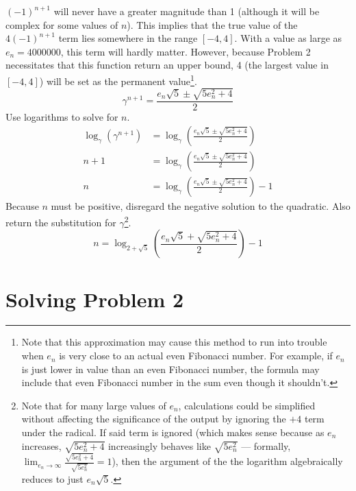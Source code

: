 \documentclass[titlepage]{article}
\begin{document}
$(-1)^{n+1}$ will never have a greater magnitude than 1 (although it will be complex for some values of $n$). This implies that the true value of the $4(-1)^{n+1}$ term lies somewhere in the range $[-4,4]$. With a value as large as $e_n=4000000$, this term will hardly matter. However, because Problem 2 necessitates that this function return an upper bound, 4 (the largest value in $[-4,4]$) will be set as the permanent value\footnote{Note that this approximation may cause this method to run into trouble when $e_n$ is very close to an actual even Fibonacci number. For example, if $e_n$ is just lower in value than an even Fibonacci number, the formula may include that even Fibonacci number in the sum even though it shouldn't.}.
\begin{equation*}
    \gamma^{n+1} = \frac{e_n\sqrt{5}\pm\sqrt{5e_n^2+4}}{2}
\end{equation*}
Use logarithms to solve for $n$.
\begin{align*}
    \log_\gamma\left( \gamma^{n+1} \right) &= \log_\gamma\left( \frac{e_n\sqrt{5}\pm\sqrt{5e_n^2+4}}{2} \right)\\
    n+1 &= \log_\gamma\left( \frac{e_n\sqrt{5}\pm\sqrt{5e_n^2+4}}{2} \right)\\
    n &= \log_\gamma\left( \frac{e_n\sqrt{5}\pm\sqrt{5e_n^2+4}}{2} \right)-1
\end{align*}
Because $n$ must be positive, disregard the negative solution to the quadratic. Also return the substitution for $\gamma$\footnote{Note that for many large values of $e_n$, calculations could be simplified without affecting the significance of the output by ignoring the $+4$ term under the radical. If said term is ignored (which makes sense because as $e_n$ increases, $\sqrt{5e_n^2+4}$ increasingly behaves like $\sqrt{5e_n^2}$ --- formally, $\lim_{e_n\to\infty}\frac{\sqrt{5e_n^2+4}}{\sqrt{5e_n^2}}=1$), then the argument of the the logarithm algebraically reduces to just $e_n\sqrt{5}$.}.
\begin{equation}\label{eqn:n}
    n = \log_{2+\sqrt{5}}\left( \frac{e_n\sqrt{5}+\sqrt{5e_n^2+4}}{2} \right)-1
\end{equation}
\newpage



\section{Solving Problem 2}
\end{document}
